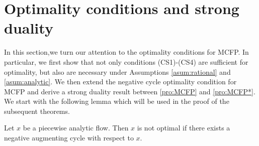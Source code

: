 \documentclass{svjour3}                     \smartqed
\begin{document}
\section{Optimality conditions and strong duality}
\label{sec:OptCond}

In this section,we turn our attention to the optimality conditions for MCFP. In particular, we first show that not only conditions (CS1)-(CS4) are sufficient for optimality, but also are necessary under Assumptions \ref{asum:rational} and  \ref{asum:analytic}. We then extend the negative cycle optimality condition for MCFP and derive a strong duality result between \eqref{pro:MCFP} and \eqref{pro:MCFP*}. We start with the following lemma which will be used in the proof of the subsequent theorems.


\begin{lemma}
\label{lem:NGOC}
Let $x$ be a piecewise analytic flow. Then $x$ is not optimal if there exists a negative augmenting cycle with respect to $x$.
\end{lemma}
\end{document}

